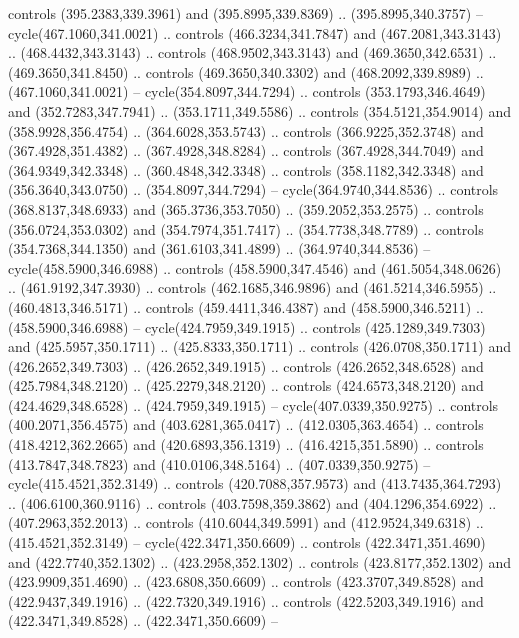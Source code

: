 \begin{scope}[cm={{1.25,0.0,0.0,-1.25,(0.0,743.43331)}}]
    controls (395.2383,339.3961) and (395.8995,339.8369) .. (395.8995,340.3757) --
    cycle(467.1060,341.0021) .. controls (466.3234,341.7847) and
    (467.2081,343.3143) .. (468.4432,343.3143) .. controls (468.9502,343.3143) and
    (469.3650,342.6531) .. (469.3650,341.8450) .. controls (469.3650,340.3302) and
    (468.2092,339.8989) .. (467.1060,341.0021) -- cycle(354.8097,344.7294) ..
    controls (353.1793,346.4649) and (352.7283,347.7941) .. (353.1711,349.5586) ..
    controls (354.5121,354.9014) and (358.9928,356.4754) .. (364.6028,353.5743) ..
    controls (366.9225,352.3748) and (367.4928,351.4382) .. (367.4928,348.8284) ..
    controls (367.4928,344.7049) and (364.9349,342.3348) .. (360.4848,342.3348) ..
    controls (358.1182,342.3348) and (356.3640,343.0750) .. (354.8097,344.7294) --
    cycle(364.9740,344.8536) .. controls (368.8137,348.6933) and
    (365.3736,353.7050) .. (359.2052,353.2575) .. controls (356.0724,353.0302) and
    (354.7974,351.7417) .. (354.7738,348.7789) .. controls (354.7368,344.1350) and
    (361.6103,341.4899) .. (364.9740,344.8536) -- cycle(458.5900,346.6988) ..
    controls (458.5900,347.4546) and (461.5054,348.0626) .. (461.9192,347.3930) ..
    controls (462.1685,346.9896) and (461.5214,346.5955) .. (460.4813,346.5171) ..
    controls (459.4411,346.4387) and (458.5900,346.5211) .. (458.5900,346.6988) --
    cycle(424.7959,349.1915) .. controls (425.1289,349.7303) and
    (425.5957,350.1711) .. (425.8333,350.1711) .. controls (426.0708,350.1711) and
    (426.2652,349.7303) .. (426.2652,349.1915) .. controls (426.2652,348.6528) and
    (425.7984,348.2120) .. (425.2279,348.2120) .. controls (424.6573,348.2120) and
    (424.4629,348.6528) .. (424.7959,349.1915) -- cycle(407.0339,350.9275) ..
    controls (400.2071,356.4575) and (403.6281,365.0417) .. (412.0305,363.4654) ..
    controls (418.4212,362.2665) and (420.6893,356.1319) .. (416.4215,351.5890) ..
    controls (413.7847,348.7823) and (410.0106,348.5164) .. (407.0339,350.9275) --
    cycle(415.4521,352.3149) .. controls (420.7088,357.9573) and
    (413.7435,364.7293) .. (406.6100,360.9116) .. controls (403.7598,359.3862) and
    (404.1296,354.6922) .. (407.2963,352.2013) .. controls (410.6044,349.5991) and
    (412.9524,349.6318) .. (415.4521,352.3149) -- cycle(422.3471,350.6609) ..
    controls (422.3471,351.4690) and (422.7740,352.1302) .. (423.2958,352.1302) ..
    controls (423.8177,352.1302) and (423.9909,351.4690) .. (423.6808,350.6609) ..
    controls (423.3707,349.8528) and (422.9437,349.1916) .. (422.7320,349.1916) ..
    controls (422.5203,349.1916) and (422.3471,349.8528) .. (422.3471,350.6609) --

\end{scope}
